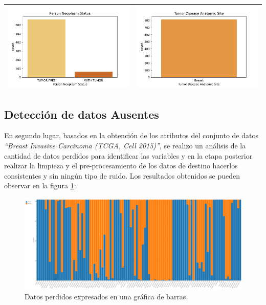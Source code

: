 \begin{center}
\begin{tabular}{ |c|c|c|c| }
		\\  \hline                
	\end{tabular} 
	\begin{tabular}{ |c|c| }  
	\hline 
		\includegraphics[width=.22\textwidth]{NOTEBOOK/IMAGENES_CRUDAS/109} 
		& \includegraphics[width=.25\textwidth]{NOTEBOOK/IMAGENES_CRUDAS/110}
		\\  \hline 
	\end{tabular} 
\end{center} 



\subsection{Detección de datos Ausentes}
En segundo lugar, basados en la obtención de los atributos del conjunto de datos \textit{“Breast Invasive Carcinoma (TCGA, Cell 2015)”}, se realizo un análisis de la cantidad de datos perdidos para identificar las variables y en la etapa posterior realizar la limpieza y el pre-procesamiento de los datos de destino hacerlos consistentes y sin ningún tipo de ruido. Los resultados obtenidos se pueden observar en la figura \ref{Missing_Bar_Chart}:


\begin{figure}[!htb]
	\centering
	\includegraphics[width=1\linewidth]{IMAGENES/Missing_Bar_Chart}
	\caption{Datos perdidos expresados en una gráfica de barras.}
	\label{Missing_Bar_Chart}
\end{figure}

